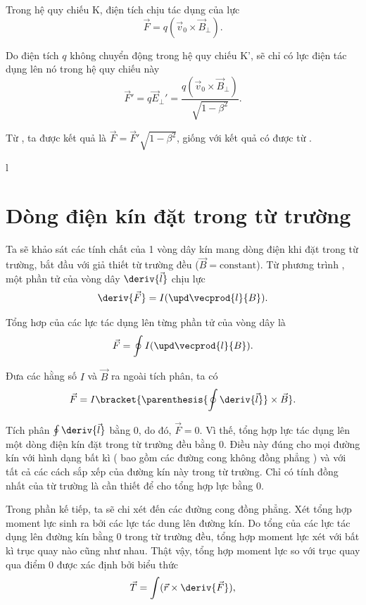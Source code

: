 Trong hệ quy chiếu K, điện tích chịu tác dụng của lực 
\begin{equation}\label{eq:6_65}
    \vec{F} = q (\vec{v}_0 \times \vec{B}_{\perp}).
\end{equation}

\noindent
Do điện tích $q$ không chuyển động trong hệ quy chiếu K', sẽ chỉ có lực điện tác dụng lên nó trong hệ quy chiếu này
\begin{equation}\label{eq:6_66}
    \vec{F}' = q \vec{E}_{\perp}' = \frac{q (\vec{v}_0 \times \vec{B}_{\perp})}{\sqrt{1-\beta^2}}.
\end{equation}

\noindent
Từ , ta được kết quả là $\vec{F} = \vec{F}' \sqrt{1-\beta^2}$, giống với kết quả có được từ .

l\section{ Dòng điện kín đặt trong từ trường }\label{sec:6_8}

Ta sẽ khảo sát các tính chất của 1 vòng dây kín mang dòng điện khi đặt trong từ trường, bắt đầu với giả thiết từ trường đều  ($\vec{B}=\text{constant}$). Từ phương trình , một phần tử của vòng dây $\deriv{\vec{l}}$ chịu lực 
\begin{equation}\label{eq:6_67}
    \deriv{\vec{F}} = I (\upd\vecprod{l}{B}).
\end{equation}

\noindent
Tổng hơp của các lực tác dụng lên từng phần tử của vòng dây là \begin{equation}\label{eq:6_68}
    \vec{F} = \oint I (\upd\vecprod{l}{B}).
\end{equation}

\noindent
 Đưa các hằng số  $I$ và $\vec{B}$ ra ngoài tích phân, ta có
\begin{equation*}
    \vec{F} = I \bracket{ \parenthesis{\oint \deriv{\vec{l}} } \times \vec{B} }.
\end{equation*}

\noindent
 Tích phân $\oint\deriv{\vec{l}}$ bằng 0, do đó, $\vec{F}=0$. Vì thế, tổng hợp lực tác dụng lên một dòng điện kín đặt trong từ trường đều bằng 0. Điều này đúng cho mọi đường kín với hình dạng bất kì ( bao gồm các đường cong không đồng phẳng ) và với tất cả các cách sắp xếp của đường kín này trong từ trường. Chỉ có tính đồng nhất của từ trường là cần thiết để cho tổng hợp lực bằng 0.

Trong phần kế tiếp, ta sẽ chi xét đến các đường cong đồng phẳng. Xét tổng hợp moment lực sinh ra bởi các lực tác dung lên đường kín. Do tổng của các lực tác dụng lên đường kín bằng 0 trong từ trường đều, tổng hợp moment lực xét với bất kì trục quay nào cũng như nhau. Thật vậy, tổng hợp moment lực so với trục quay qua điểm $0$ được xác định bởi biểu thức
\begin{equation*}
    \vec{T} = \int (\vec{r} \times \deriv{\vec{F}}),
\end{equation*}


